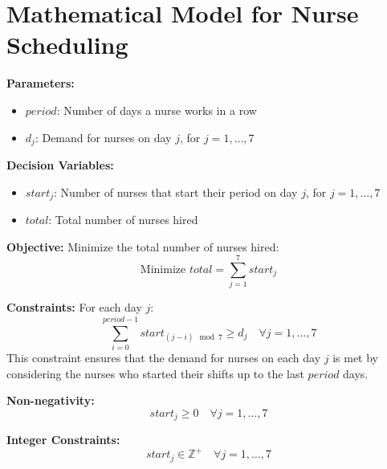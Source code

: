 \documentclass{article}
\begin{document}
\section*{Mathematical Model for Nurse Scheduling}

\textbf{Parameters:}
\begin{itemize}
    \item $period$: Number of days a nurse works in a row
    \item $d_j$: Demand for nurses on day $j$, for $j = 1, \ldots, 7$
\end{itemize}

\textbf{Decision Variables:}
\begin{itemize}
    \item $start_j$: Number of nurses that start their period on day $j$, for $j = 1, \ldots, 7$
    \item $total$: Total number of nurses hired
\end{itemize}

\textbf{Objective:} 
Minimize the total number of nurses hired:
\[
\text{Minimize } total = \sum_{j=1}^{7} start_j
\]

\textbf{Constraints:}
For each day $j$:
\[
\sum_{i=0}^{period-1} start_{(j-i) \mod 7} \geq d_j \quad \forall j = 1, \ldots, 7
\]
This constraint ensures that the demand for nurses on each day $j$ is met by considering the nurses who started their shifts up to the last $period$ days.

\textbf{Non-negativity:}
\[
start_j \geq 0 \quad \forall j = 1, \ldots, 7
\]

\textbf{Integer Constraints:}
\[
start_j \in \mathbb{Z}^+ \quad \forall j = 1, \ldots, 7
\]
\end{document}
